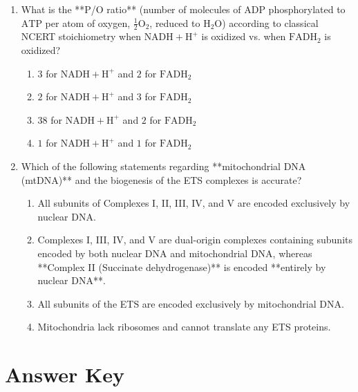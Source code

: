 \documentclass[11pt, a4paper]{article}
\begin{document}
\begin{enumerate}[label=\textbf{\arabic*.}]
\item What is the **P/O ratio** (number of molecules of $\text{ADP}$ phosphorylated to $\text{ATP}$ per atom of oxygen, $\frac{1}{2}\text{O}_2$, reduced to $\text{H}_2\text{O}$) according to classical NCERT stoichiometry when $\text{NADH} + \text{H}^+$ is oxidized vs. when $\text{FADH}_2$ is oxidized?
\begin{enumerate}[label=(\Alph*)]
    \item $3$ for $\text{NADH} + \text{H}^+$ and $2$ for $\text{FADH}_2$
    \item $2$ for $\text{NADH} + \text{H}^+$ and $3$ for $\text{FADH}_2$
    \item $38$ for $\text{NADH} + \text{H}^+$ and $2$ for $\text{FADH}_2$
    \item $1$ for $\text{NADH} + \text{H}^+$ and $1$ for $\text{FADH}_2$
\end{enumerate}

\item Which of the following statements regarding **mitochondrial DNA (mtDNA)** and the biogenesis of the ETS complexes is accurate?
\begin{enumerate}[label=(\Alph*)]
    \item All subunits of Complexes I, II, III, IV, and V are encoded exclusively by nuclear DNA.
    \item Complexes I, III, IV, and V are dual-origin complexes containing subunits encoded by both nuclear DNA and mitochondrial DNA, whereas **Complex II (Succinate dehydrogenase)** is encoded **entirely by nuclear DNA**.
    \item All subunits of the ETS are encoded exclusively by mitochondrial DNA.
    \item Mitochondria lack ribosomes and cannot translate any ETS proteins.
\end{enumerate}

\end{enumerate}

\newpage

\section*{Answer Key}
\end{document}
